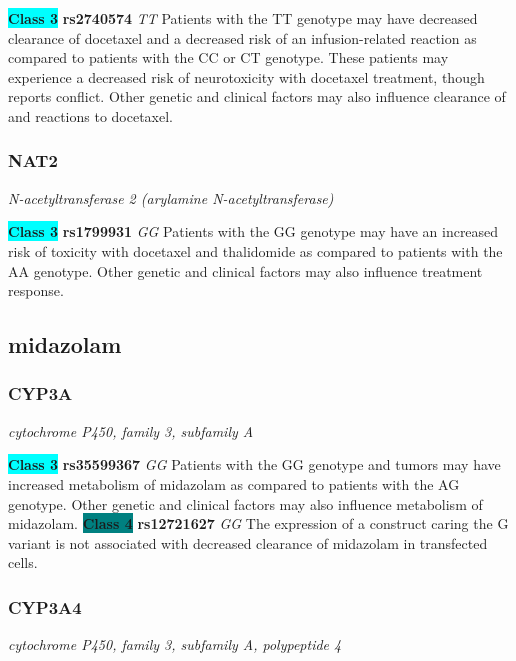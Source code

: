 \documentclass{report}
\begin{document}
\textbf{\colorbox{cyan} {Class 3}} \textbf{ rs2740574 } \textit{ TT }
Patients with the TT genotype may have decreased clearance of docetaxel and a decreased risk of an infusion-related reaction as compared to patients with the CC or CT genotype. These patients may experience a decreased risk of neurotoxicity with docetaxel treatment, though reports conflict. Other genetic and clinical factors may also influence clearance of and reactions to docetaxel.\newline\subsubsection{ NAT2 }
\textit{ N-acetyltransferase 2 (arylamine N-acetyltransferase) }

\textbf{\colorbox{cyan} {Class 3}} \textbf{ rs1799931 } \textit{ GG }
Patients with the GG genotype may have an increased risk of toxicity with docetaxel and thalidomide as compared to patients with the AA genotype. Other genetic and clinical factors may also influence treatment response.\newline\subsection{ midazolam }\subsubsection{ CYP3A }
\textit{ cytochrome P450, family 3, subfamily A }

\textbf{\colorbox{cyan} {Class 3}} \textbf{ rs35599367 } \textit{ GG }
Patients with the GG genotype and tumors may have increased metabolism of midazolam as compared to patients with the AG genotype. Other genetic and clinical factors may also influence metabolism of midazolam. \newline\textbf{\colorbox{teal} {Class 4}} \textbf{ rs12721627 } \textit{ GG }
The expression of a construct caring the G variant is not associated with decreased clearance of midazolam in transfected cells.\newline\subsubsection{ CYP3A4 }
\textit{ cytochrome P450, family 3, subfamily A, polypeptide 4 }
\end{document}

